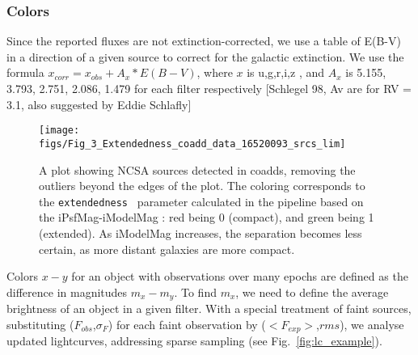 \documentclass[fleqn,usenatbib]{mnras}  %
\begin{document}
%
% 




\subsubsection{Colors}
%
%


%
%


%
%

Since the reported fluxes are not extinction-corrected, we use a table of E(B-V) in a direction of a given source to correct for the galactic extinction. We use the formula  $x_{corr}  = x_{obs} + A_{x} * E(B-V)$, where $x$ is  u,g,r,i,z , and $A_x$ is 5.155, 3.793, 2.751, 2.086, 1.479  for each filter respectively  [Schlegel 98, Av are for RV = 3.1, also suggested by Eddie Schlafly] 




\begin{figure}
\label{fig:coadds_ext}
 \texttt{[image: figs/Fig\_3\_Extendedness\_coadd\_data\_16520093\_srcs\_lim]}
 \cprotect\caption{A plot showing NCSA sources detected in coadds, removing the outliers beyond the edges of the plot. The coloring corresponds to the \verb|extendedness | parameter calculated in the pipeline based on the iPsfMag-iModelMag : red being 0 (compact), and green being 1 (extended). As iModelMag increases, the separation becomes less certain, as more distant galaxies are more compact.  }
\end{figure}
% 

Colors $x-y$ for an object with observations over many epochs are defined as the difference in magnitudes $m_{x} - m_{y}$. To find $m_{x}$, we need to define the average brightness of an object in  a given filter. With a special treatment of faint sources, substituting ($F_{obs}$,$\sigma_F$) for each faint observation by ($<F_{exp}>$,$rms$), we analyse updated lightcurves, addressing sparse sampling (see Fig.~\ref{fig:lc_example}).  
\end{document}
